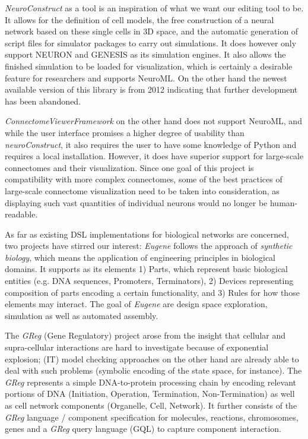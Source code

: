 \documentclass[a4paper,11pt]{article}
\begin{document}
\emph{NeuroConstruct} \citep{Gleeson2007} as a tool is an inspiration of what we want our editing tool to be. It allows for the definition of cell models, the free construction of a neural network based on these single cells in 3D space, and the automatic generation of script files for simulator packages to carry out simulations. It does however only support NEURON \citep{Hines1994} and GENESIS \citep{Bower2003} as its simulation engines. It also allows the finished simulation to be loaded for visualization, which is certainly a desirable feature for researchers and supports NeuroML. On the other hand the newest available version of this library is from 2012 indicating that further development has been abandoned.

\emph{ConnectomeViewerFramework} \citep{Gerhard2011} on the other hand does not support NeuroML, and while the user interface promises a higher degree of usability than \emph{neuroConstruct}, it also requires the user to have some knowledge of Python and requires a local installation. However, it does have superior support for large-scale connectomes and their visualization. Since one goal of this project is compatibility with more complex connectomes, some of the best practices of large-scale connectome visualization need to be taken into consideration, as displaying such vast quantities of individual neurons would no longer be human-readable.

As far as existing DSL implementations for biological networks are concerned, two projects have stirred our interest: \emph{Eugene} \citep{Bilitchenko2011Eugene} follows the approach of \textit{synthetic biology}, which means the application of engineering principles in biological domains. It supports as its elements 1) Parts, which represent basic biological entities (e.g. DNA sequences, Promoters, Terminators), 2) Devices representing composition of parts encoding a certain functionality, and 3) Rules for how those elements may interact. The goal of \emph{Eugene} are design space exploration, simulation as well as automated assembly.

The \emph{GReg} (Gene Regulatory) project \citep{Sedlmajer2012Greg} arose from the insight that cellular and supra-cellular interactions are hard to investigate because of exponential explosion; (IT) model checking approaches on the other hand are already able to deal with such problems (symbolic encoding of the state space, for instance). The \emph{GReg} represents a simple DNA-to-protein processing chain by encoding relevant portions of DNA (Initiation, Operation, Termination, Non-Termination) as well as cell network components (Organelle, Cell, Network). It further consists of the \emph{GReg} language / component specification for molecules, reactions, chromosomes, genes and a \emph{GReg} query language (GQL) to capture component interaction.
\\[0,2cm]
\end{document}
